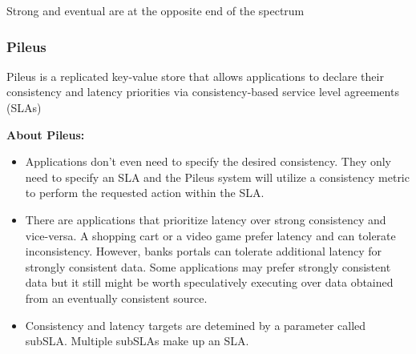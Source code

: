 \documentclass[a4paper]{article}
\begin{document}
Strong and eventual are at the opposite end of the spectrum

\subsubsection{Pileus}
Pileus is a replicated key-value store that allows applications to declare their consistency and latency priorities via consistency-based service level agreements (SLAs)

\textbf{About Pileus:}
\begin{itemize}
    \item 
    Applications don't even need to specify the desired consistency. They only need to specify an SLA and the Pileus system will utilize a consistency metric to perform the requested action within the SLA.
    \item 
    There are applications that prioritize latency over strong consistency and vice-versa. A shopping cart or a video game prefer latency and can tolerate inconsistency. However, banks portals can tolerate additional latency for strongly consistent data. Some applications may prefer strongly consistent data but it still might be worth speculatively executing over data obtained from an eventually consistent source.
    \item 
    Consistency and latency targets are detemined by a parameter called subSLA. Multiple subSLAs make up an SLA. 
\end{itemize}
\end{document}
